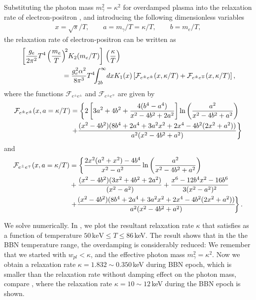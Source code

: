 Substituting the photon mass $m^2_\gamma=\kappa^2$ for overdamped plasma into the relaxation rate of electron-positron , and introducing the following dimensionless variables
\begin{align}
x=\sqrt{s}/T,\qquad a=m_\gamma/T=\kappa/T,\qquad b=m_e/T,
\end{align}
the relaxation rate of electron-positron can be written as
\begin{align}\label{Numerical_eq}
&\left[\frac{g_e}{2\pi^2}T^4\left(\frac{m_e}{T}\right)^{\!2}\!K_2(m_e/T)\right]\,\left(\frac{\kappa}{T}\right)\notag\\
&\qquad\qquad\qquad=\frac{g^2_e\alpha^2}{8\pi^3}T^4\!\!\int_{2b}^\infty\!dxK_1(x)\left[\mathcal{F}_{e^\pm e^\pm}(x,\kappa/T)+\mathcal{F}_{e^\pm e^\mp}(x,\kappa/T)\right],
\end{align}
where the functions $\mathcal{F}_{e^\pm e^\pm}$ and $\mathcal{F}_{e^\pm e^\mp}$ are given by
\begin{align}
\mathcal{F}_{e^\pm e^\pm}(x,a=\kappa/T)&=\left\{2\left[3a^2+4b^2+\frac{4(b^4-a^4)}{x^2-4b^2+2a^2}\right]\ln\left(\frac{a^2}{x^2-4b^2+a^2}\right)\right.\notag\\
&\left.+\frac{(x^2-4b^2)(8b^4+2a^4+3a^2x^2+2x^4-4b^2(2x^2+a^2))}{a^2(x^2-4b^2+a^2)}\right\}
\end{align}
and 
\begin{align}
\mathcal{F}_{e^\pm e^\mp}(x,a=\kappa/T)&=\left\{\frac{2x^2(a^2+x^2)-4b^4}{x^2-a^2}\ln\left(\frac{a^2}{x^2-4b^2+a^2}\right)\right.\notag\\
&+\frac{(x^2-4b^2)(3x^2+4b^2+2a^2)}{(x^2-a^2)}+\frac{x^6-12b^4x^2-16b^6}{3(x^2-a^2)^2}\notag\\
&\left.+\frac{(x^2-4b^2)(8b^4+2a^4+3a^2x^2+2x^4-4b^2(2x^2+a^2))}{a^2(x^2-4b^2+a^2)}\!\right\}.
\end{align}

We solve  numerically. In , we plot the resultant relaxation rate $\kappa$ that satisfies  as a function of temperature $50\,\mathrm{keV} \leqslant T\leqslant 86$\,keV. The result shows that in the the BBN temperature range, the overdamping is considerably reduced: We remember that we started with $w_{pl}<\kappa$, and the effective photon mass $m^2_\gamma=\kappa^2$. Now we obtain a relaxation rate $\kappa=1.832\sim 0.350$\,keV during BBN epoch, which is smaller than the relaxation rate without damping effect on the photon mass, compare , where the relaxation rate $\kappa=10\sim12$\,keV during the BBN epoch is shown.

